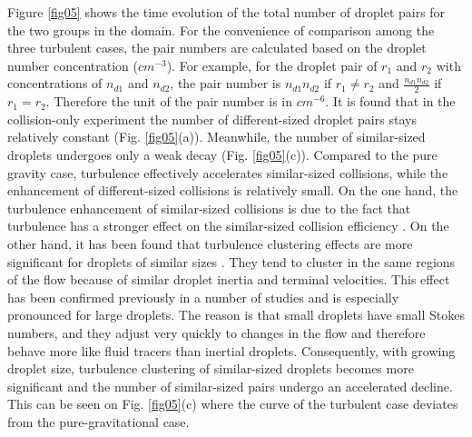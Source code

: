 Figure \ref{fig05} shows the time evolution of the total number of droplet pairs for the two groups in the domain. For the convenience of comparison among the three turbulent cases, the pair numbers are calculated based on the droplet number concentration ($cm^{-3}$). For example, for the droplet pair of $r_1$ and $r_2$ with concentrations of $n_{d1}$ and $n_{d2}$, the pair number is $n_{d1}n_{d2}$ if $r_1 \neq r_2$ and $\frac{n_{d1}n_{d2}}{2}$ if $r_1 = r_2$. Therefore the unit of the pair number is in $cm^{-6}$. It is found that in the collision-only experiment the number of different-sized droplet pairs stays relatively constant (Fig. \ref{fig05}(a)). Meanwhile, the number of similar-sized droplets undergoes only a weak decay (Fig. \ref{fig05}(c)). Compared to the pure gravity case, turbulence effectively accelerates similar-sized collisions, while the enhancement of different-sized collisions is relatively small. On the one hand, the turbulence enhancement of similar-sized collisions is due to the fact that turbulence has a stronger effect on the similar-sized collision efficiency \citep{Chen2018}. On the other hand, it has been found that turbulence clustering effects are more significant for droplets of similar sizes \citep{Chen2016}. They tend to cluster in the same regions of the flow because of similar droplet inertia and terminal velocities. This effect has been confirmed previously in a number of studies \citep[e.g., ][]{Ayala2008a, Franklin2005} and is especially pronounced for large droplets. The reason is that small droplets have small Stokes numbers, and they adjust very quickly to changes in the flow and therefore behave more like fluid tracers than inertial droplets. Consequently, with growing droplet size, turbulence clustering of similar-sized droplets becomes more significant and the number of similar-sized pairs undergo an accelerated decline. This can be seen on Fig. \ref{fig05}(c) where the curve of the turbulent case deviates from the pure-gravitational case.

